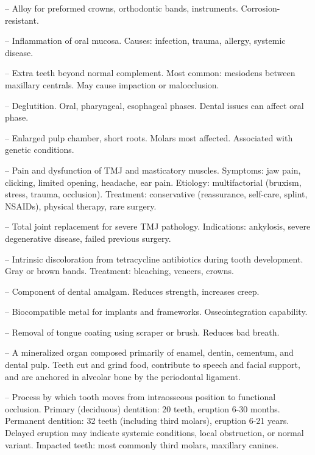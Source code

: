 -- Alloy for preformed crowns, orthodontic bands, instruments. Corrosion-resistant.

-- Inflammation of oral mucosa. Causes: infection, trauma, allergy, systemic disease.

-- Extra teeth beyond normal complement. Most common: mesiodens between maxillary centrals. May cause impaction or malocclusion.

-- Deglutition. Oral, pharyngeal, esophageal phases. Dental issues can affect oral phase.

-- Enlarged pulp chamber, short roots. Molars most affected. Associated with genetic conditions.

-- Pain and dysfunction of TMJ and masticatory muscles. Symptoms: jaw pain, clicking, limited opening, headache, ear pain. Etiology: multifactorial (bruxism, stress, trauma, occlusion). Treatment: conservative (reassurance, self-care, splint, NSAIDs), physical therapy, rare surgery.

-- Total joint replacement for severe TMJ pathology. Indications: ankylosis, severe degenerative disease, failed previous surgery.

-- Intrinsic discoloration from tetracycline antibiotics during tooth development. Gray or brown bands. Treatment: bleaching, veneers, crowns.

-- Component of dental amalgam. Reduces strength, increases creep.

-- Biocompatible metal for implants and frameworks. Osseointegration capability.

-- Removal of tongue coating using scraper or brush. Reduces bad breath.

-- A mineralized organ composed primarily of enamel, dentin, cementum, and dental pulp. Teeth cut and grind food, contribute to speech and facial support, and are anchored in alveolar bone by the periodontal ligament.

-- Process by which tooth moves from intraosseous position to functional occlusion. Primary (deciduous) dentition: 20 teeth, eruption 6-30 months. Permanent dentition: 32 teeth (including third molars), eruption 6-21 years. Delayed eruption may indicate systemic conditions, local obstruction, or normal variant. Impacted teeth: most commonly third molars, maxillary canines.

